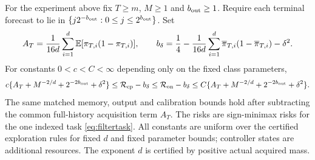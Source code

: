 \begin{theorem}\label{thm:hmm}
For the experiment above fix $T\ge m$, $M\ge1$ and $b_{\rm out}\ge1$. Require each terminal forecast to lie in $\{j2^{-b_{\rm out}}:0\le j\le2^{b_{\rm out}}\}$. Set
\[
 A_T=\frac1{16d}\sum_{i=1}^d\mathbb E[\pi_{T,i}(1-\pi_{T,i})],\qquad
 b_\delta=\frac14-\frac1{16d}\sum_{i=1}^d
 \overline\pi_{T,i}(1-\overline\pi_{T,i})-\delta^2.
\]
For constants $0<c<C<\infty$ depending only on the fixed class parameters,
\begin{equation}\label{eq:hmmlaw}
 c\{A_T+M^{-2/d}+2^{-2b_{\rm out}}+\delta^2\}
 \le\mathcal R_{\mathrm{cp}}-b_\delta
 \le\mathcal R_{\mathrm{on}}-b_\delta
 \le C\{A_T+M^{-2/d}+2^{-2b_{\rm out}}+\delta^2\}.
\end{equation}
The same matched memory, output and calibration bounds hold after subtracting the common full-history acquisition term $A_T$. The risks are sign-minimax risks for the one indexed task \eqref{eq:filtertask}. All constants are uniform over the certified exploration rules for fixed $d$ and fixed parameter bounds; controller states are additional resources. The exponent $d$ is certified by positive actual acquired mass.
\end{theorem}
